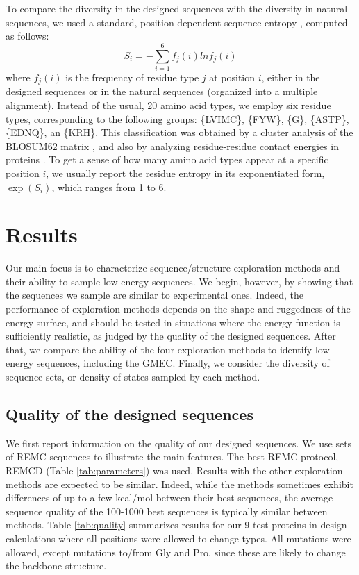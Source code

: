 To compare the diversity in the designed sequences with the diversity in natural sequences, we used a standard,
position-dependent sequence entropy \cite{DurbinBK}, computed as follows:
\begin{equation} \label{eq:entropy}
S_i = - \sum_{i=1}^6 f_j (i) ln f_j (i)
\end{equation}
where $f_j(i)$ is the frequency of residue type $j$ at position $i$, either in the designed sequences or in the
natural sequences (organized into a multiple alignment). Instead of the usual, 20 amino acid types, we employ
six residue types, corresponding to the following groups: \{LVIMC\}, \{FYW\}, \{G\}, \{ASTP\}, \{EDNQ\}, an
\{KRH\}. This classification was obtained by a cluster analysis of the BLOSUM62 matrix \cite{Murphy02}, and also
by analyzing residue-residue contact energies in proteins \cite{Launay07}. To get a sense of how many amino acid
types appear at a specific position $i$, we usually report the residue entropy in its exponentiated form, $\exp(S_i)$,
which ranges from 1 to 6. 

\section{Results}
Our main focus is to characterize sequence/structure exploration methods and their ability to sample low energy
sequences. We begin, however, by showing that the sequences we sample are similar to experimental ones. Indeed,
the performance of exploration methods depends on the shape and ruggedness of the energy surface, and should be
tested in situations where the energy function is sufficiently realistic, as judged by the quality of the designed
sequences. After that, we compare the ability of the four exploration methods to identify low energy sequences,
including the GMEC. Finally, we consider the diversity of sequence sets, or density of states sampled by each method.

\subsection{Quality of the designed sequences}
We first report information on the quality of our designed sequences. We use sets of REMC sequences to illustrate
the main features. The best REMC protocol, REMCD (Table \ref{tab:parameters}) was used. Results with the other
exploration methods are expected to be similar. Indeed, while the methods sometimes exhibit differences of up to a
few kcal/mol between their best sequences, the average sequence quality of the 100-1000 best sequences is typically similar
between methods. Table \ref{tab:quality} summarizes results for our 9 test proteins in design calculations where all
positions were allowed to change types. All mutations were allowed, except mutations to/from Gly and Pro, since these
are likely to change the backbone structure.

